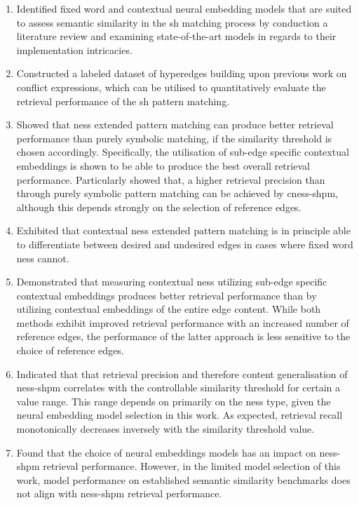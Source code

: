 \documentclass[11pt]{scrreprt}
\begin{document}
{\begin{enumerate}[label=\textbf{C.\arabic*}, leftmargin=0pt, labelwidth=*, align=left, labelsep=0.5em, itemindent=0pt, listparindent=\parindent]
\item Identified fixed word and contextual neural embedding models that are suited to assess semantic similarity in the \gls{sh} matching process by conduction a literature review and examining state-of-the-art models in regards to their implementation intricacies. 

\item Constructed a labeled dataset of hyperedges building upon previous work on conflict expressions, which can be utilised to quantitatively evaluate the retrieval performance of the \gls{sh} pattern matching.

\item Showed that \gls{ness} extended pattern matching can produce better retrieval performance than purely symbolic matching, if the similarity threshold is chosen accordingly. Specifically, the utilisation of sub-edge specific contextual embeddings is shown to be able to produce the best overall retrieval performance. Particularly showed that, a higher retrieval precision than through purely symbolic pattern matching can be achieved by \gls{cness-shpm}, although this depends strongly on the selection of reference edges.

\item Exhibited that contextual \gls{ness} extended pattern matching is in principle able to differentiate between desired and undesired edges in cases where fixed word \gls{ness} cannot.

\item Demonstrated that measuring contextual \gls{ness} utilizing sub-edge specific contextual embeddings produces better retrieval performance than by utilizing contextual embeddings of the entire edge content. While both methods exhibit improved retrieval performance with an increased number of reference edges, the performance of the latter approach is less sensitive to the choice of reference edges.

\item Indicated that that retrieval precision and therefore content generalisation of \gls{ness-shpm} correlates with the controllable similarity threshold for certain a value range. This range depends on primarily on the \gls{ness} type, given the neural embedding model selection in this work. 
As expected, retrieval recall monotonically decreases inversely with the similarity threshold value.

\item Found that the choice of neural embeddings models has an impact on \gls{ness-shpm} retrieval performance. However, in the limited model selection of this  work, model performance on established semantic similarity benchmarks does not align with \gls{ness-shpm} retrieval performance.


\end{enumerate}}
\end{document}
